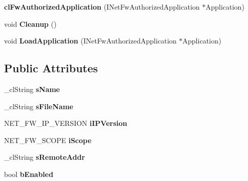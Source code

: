 \begin{DoxyCompactItemize}
\item 
\hypertarget{classcl_fw_authorized_application_a0700c8a03b2f841d38c6611d78798b46}{
{\bfseries clFwAuthorizedApplication} (INetFwAuthorizedApplication $\ast$Application)}
\label{classcl_fw_authorized_application_a0700c8a03b2f841d38c6611d78798b46}

\item 
\hypertarget{classcl_fw_authorized_application_adae30f5c0d5055073da0da54b06ec9d9}{
void {\bfseries Cleanup} ()}
\label{classcl_fw_authorized_application_adae30f5c0d5055073da0da54b06ec9d9}

\item 
\hypertarget{classcl_fw_authorized_application_a11afdb45c3ffac3e7dd9de4eba3cfab6}{
void {\bfseries LoadApplication} (INetFwAuthorizedApplication $\ast$Application)}
\label{classcl_fw_authorized_application_a11afdb45c3ffac3e7dd9de4eba3cfab6}

\end{DoxyCompactItemize}
\subsection*{Public Attributes}
\begin{DoxyCompactItemize}
\item 
\hypertarget{classcl_fw_authorized_application_a6e48a61aaec689abe8a2e0dfd47a3d64}{
\_\-clString {\bfseries sName}}
\label{classcl_fw_authorized_application_a6e48a61aaec689abe8a2e0dfd47a3d64}

\item 
\hypertarget{classcl_fw_authorized_application_a0088505af09bc434d877315a2e704e97}{
\_\-clString {\bfseries sFileName}}
\label{classcl_fw_authorized_application_a0088505af09bc434d877315a2e704e97}

\item 
\hypertarget{classcl_fw_authorized_application_a503e0eca4858a98c2131961f42c72cc1}{
NET\_\-FW\_\-IP\_\-VERSION {\bfseries iIPVersion}}
\label{classcl_fw_authorized_application_a503e0eca4858a98c2131961f42c72cc1}

\item 
\hypertarget{classcl_fw_authorized_application_a3ded28a227c0ed1f516d333c9875c61c}{
NET\_\-FW\_\-SCOPE {\bfseries iScope}}
\label{classcl_fw_authorized_application_a3ded28a227c0ed1f516d333c9875c61c}

\item 
\hypertarget{classcl_fw_authorized_application_a0140346b3315ee5bb2dcc5d809a8b9c8}{
\_\-clString {\bfseries sRemoteAddr}}
\label{classcl_fw_authorized_application_a0140346b3315ee5bb2dcc5d809a8b9c8}

\item 
\hypertarget{classcl_fw_authorized_application_a0aa6444deacbe73e93a3842f1062853b}{
bool {\bfseries bEnabled}}
\label{classcl_fw_authorized_application_a0aa6444deacbe73e93a3842f1062853b}

\end{DoxyCompactItemize}
